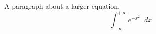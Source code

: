 \documentclass{article}
\newcommand{\diff}{\mathop{}\!d}    %
\begin{document}
	A paragraph about a larger equation.
	\[
	\int_{-\infty}^{+\infty} e^{-x^{2}} \diff x
	\]
\end{document}
